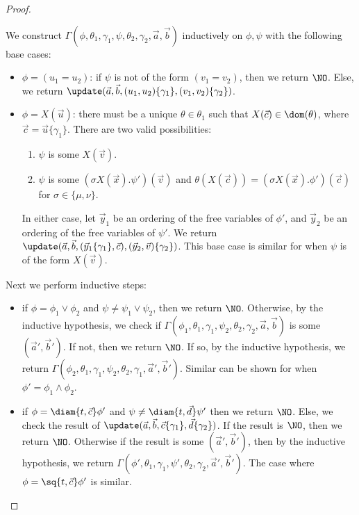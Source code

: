 \begin{proof}
\begin{itemize}
	\end{itemize}
	We construct $\Gamma(\phi, \theta_1, \gamma_1, \psi, \theta_2, \gamma_2, \vec a, \vec b)$ inductively on $\phi, \psi$ with the following base cases:
	\begin{itemize}
		\item $\phi = (u_1=u_2)$: 
		if $\psi$ is not of the form $(v_1 = v_2)$, then we return $\NO$. 
		Else, we return $\update(\vec a, \vec b, (u_1,u_2)\{\gamma_1\}, (v_1,v_2)\{\gamma_2\})$.
		\item $\phi = X(\vec u)$: there must be a unique $\theta \in \theta_1$  such that $X(\vec c)\in\dom(\theta)$, where $\vec c=\vec u\{\gamma_1\}$.
		There are two valid possibilities:
		\begin{enumerate}
			\item $\psi$ is some $X(\vec v)$.
			\item $\psi$ is some $(\sigma X(\vec x).\psi')(\vec v)$ and $\theta(X(\vec c)) = (\sigma X(\vec x).\phi')(\vec c)$ for $\sigma \in \{\mu, \nu\}$.
		\end{enumerate}
		In either case, 
		let $\vec y_1$ be an ordering of the free variables of $\phi'$, and $\vec y_2$ be an ordering of the free variables of $\psi'$. 
		We return $\update(\vec a, \vec b, (\vec y_1\{\gamma_1\}, \vec c), (\vec y_2, \vec v)\{\gamma_2\})$.
		This base case is similar for when $\psi$ is of the form $X(\vec v)$.
	\end{itemize}
	Next we perform inductive steps:
	\begin{itemize}
		\item if $\phi = \phi_1 \lor \phi_2$ and $\psi \neq \psi_1 \lor \psi_2$, then we return $\NO$. 
		Otherwise, by the inductive hypothesis, we check if $\Gamma(\phi_1, \theta_1, \gamma_1, \psi_2, \theta_2, \gamma_2, \vec a, \vec b)$ is some $(\vec a', \vec b')$. 
		If not, then we return $\NO$.
		If so, by the inductive hypothesis, we return $\Gamma(\phi_2, \theta_1, \gamma_1,\psi_2, \theta_2, \gamma_1, \vec a', \vec b')$.
		Similar can be shown for when $\phi' = \phi_1 \land \phi_2$.
		\item if $\phi = \diam{t, \vec c}\phi'$ and $\psi\neq \diam{t, \vec d}\psi'$ then we return $\NO$. 
		Else, we check the result of $\update(\vec a, \vec b, \vec c\{\gamma_1\}, \vec d\{\gamma_2\})$.
		If the result is $\NO$, then we return $\NO$. 
		Otherwise if the result is some $(\vec a', \vec b')$, then by the inductive hypothesis, we return $ \Gamma(\phi', \theta_1, \gamma_1, \psi', \theta_2,\gamma_2, \vec a', \vec b')$.
		The case where $\phi = \sq{t, \vec c}\phi'$ is similar.

\end{itemize}
\end{proof}
